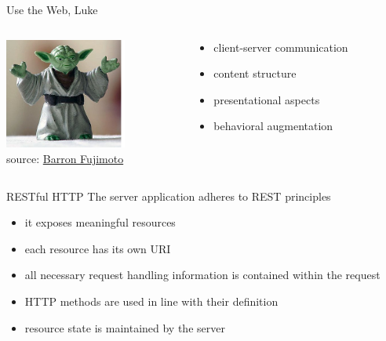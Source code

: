 \documentclass{beamer}
\begin{document}
\begin{frame}{Use the Web, Luke}
  \begin{columns}
    \begin{column}{4.0cm}
      \includegraphics[width=4cm]{images/yoda.png}
      \\
      \tiny source: \href{http://www.flickr.com/photos/barron/15483113/}{Barron Fujimoto}
    \end{column}

    \begin{column}{5.5cm}
      \begin{itemize}
        \item[HTTP] client-server communication
        \item[HTML] content structure
        \item[CSS] presentational aspects
        \item[JavaScript] behavioral augmentation
      \end{itemize}
    \end{column}
  \end{columns}
\end{frame}

\begin{frame}{RESTful HTTP}
  The server application adheres to REST principles

  \begin{itemize}
    \item it exposes meaningful resources
    \item each resource has its own URI
    \item all necessary request handling information is contained within the request
    \item HTTP methods are used in line with their definition
    \item resource state is maintained by the server
  \end{itemize}
\end{frame}
\end{document}

